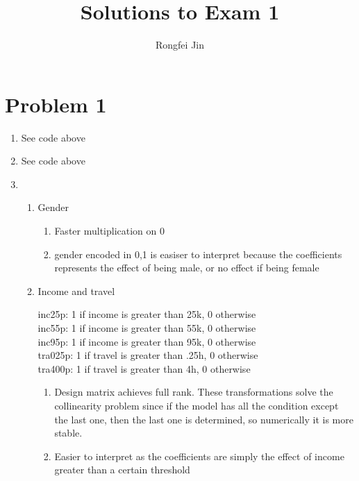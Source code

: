 \documentclass{article}
\title{Solutions to Exam 1 }
\author{Rongfei Jin}
\begin{document}
\pagestyle{fancy}
\fancyhf{}%
\fancyfoot[C]{\thepage}%
\maketitle

\section*{Problem 1}

\begin{enumerate}[label=(\alph*)]
  \item See code above
  \item See code above
  \item
    \begin{enumerate}[label=(\arabic*)]

      \item Gender
        \begin{enumerate}[label=(\roman*)]
          \item Faster multiplication on 0
          \item
            gender encoded in 0,1 is easiser to interpret because the coefficients represents the effect of being male, or no effect if being female
        \end{enumerate}
      \item Income and travel

        inc25p: 1 if income is greater than 25k, 0 otherwise \\
        inc55p: 1 if income is greater than 55k, 0 otherwise \\
        inc95p: 1 if income is greater than 95k, 0 otherwise \\
        tra025p: 1 if travel is greater than .25h, 0 otherwise \\
        tra400p: 1 if travel is greater than 4h, 0 otherwise \\

        \begin{enumerate}[label=(\roman*)]
          \item Design matrix achieves full rank.
            These transformations solve the collinearity problem since if the model has all the condition except the last one, then the last one is determined, so numerically it is more stable.

          \item
            Easier to interpret as the coefficients are simply the effect of income greater than a certain threshold


\end{enumerate}
\end{enumerate}
\end{enumerate}
\end{document}
